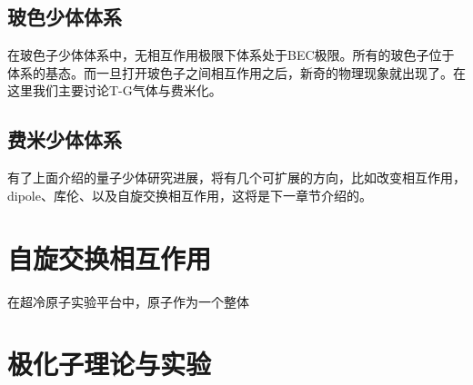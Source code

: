 \subsection{玻色少体体系}
在玻色子少体体系中，无相互作用极限下体系处于BEC极限。所有的玻色子位于体系的基态。而一旦打开玻色子之间相互作用之后，新奇的物理现象就出现了。在这里我们主要讨论T-G气体与费米化。


\subsection{费米少体体系}


有了上面介绍的量子少体研究进展，将有几个可扩展的方向，比如改变相互作用，dipole、库伦、以及自旋交换相互作用，这将是下一章节介绍的。

\section{自旋交换相互作用}\label{sec:spin-exchange}
在超冷原子实验平台中，原子作为一个整体

\section{极化子理论与实验}


